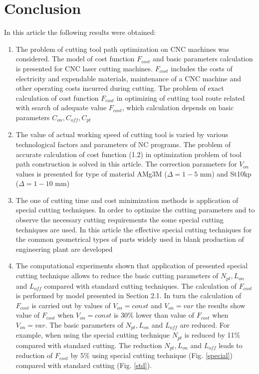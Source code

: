 \documentclass[runningheads]{llncs}
\begin{document}
\section{Conclusion}

In this article the following results were obtained:

\begin{enumerate}

\item  The problem of cutting tool path optimization on CNC machines was considered.
The model of cost function $F_{cost}$ and basic parameters calculation is presented for CNC laser cutting machines.
$F_{cost}$ includes the costs of electricity and expendable materials,
maintenance of a CNC machine and other operating costs incurred during cutting.
The problem of exact calculation of cost function  $F_{cost}$
in optimizing of cutting tool route related with search of adequate value  $F_{cost}$,
which calculation depends on basic parameters $C_{on}, C_{off}, C_{pt}$

\item The value of actual working speed of cutting tool is varied
by various technological factors and parameters of NC programs.
The problem of accurate calculation of cost function (1.2)
in optimization problem of tool path construction is solved in this article.
The correction parameters for $V_{on}$ values
is presented for type of material AMg3M ($\Delta=1-5$ mm) and St10kp ($\Delta=1-10$ mm)

\item The one of cutting time and cost minimization methods is application of special cutting techniques.
In order to optimize the cutting parameters and to observe the necessary cutting requirements
the some special cutting techniques are used.
In this article the effective special cutting techniques
for the common geometrical types of parts
widely used in blank production of engineering plant are developed

\item The computational experiments shown that
application of presented special cutting technique allows to
reduce the basic cutting parameters of $N_{pt}, L_{on}$
and $L_{off}$ compared with standard cutting techniques.
The calculation of $F_{cost}$ is performed by model presented in Section 2.1.
In turn the calculation of  $F_{cost}$ is carried out by values of
$V_{on}=const$ and $V_{on}=var$
the results show value of $F_{cost}$ when $V_{on}=const$  is 30\% lower
than value of $F_{cost}$  when $V_{on}=var$.
The basic parameters of $N_{pt}, L_{on}$
and $L_{off}$
are reduced.
For example, when using the special cutting technique
$N_{pt}$ is reduced by 11\%  compared with standard cutting.
The reduction $N_{pt}, L_{on}$
and $L_{off}$
leads to reduction of $F_{cost}$ by 5\%
using special cutting technique (Fig. \ref{special})
compared with standard cutting (Fig. \ref{std}).

\end{enumerate}



\nocite{*}
\end{document}
